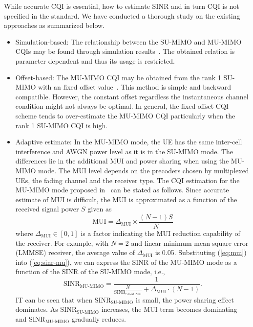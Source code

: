 \documentclass[a4paper,12pt]{article}%
\begin{document}
While accurate CQI is essential, how to estimate SINR and in turn CQI is not specified in the standard. We have conducted a thorough study on the existing approaches as summarized below.
\begin{itemize}
\item Simulation-based: The relationship between the SU-MIMO and MU-MIMO CQIs may be found through simulation results~\cite{Zhu2008}. The obtained relation is parameter dependent and thus its usage is restricted.
%
\item Offset-based: The MU-MIMO CQI may be obtained from the rank 1 SU-MIMO with an fixed offset value~\cite{Maeaettaenen2009}. This method is simple and backward compatible. However, the constant offset regardless the instantaneous channel condition might not always be optimal. In general, the fixed offset CQI scheme tends to over-estimate the MU-MIMO CQI particularly when the rank 1 SU-MIMO CQI is high.
\item Adaptive estimate: In the MU-MIMO mode, the UE has the same inter-cell interference and AWGN power level as it is in the SU-MIMO mode. The differences lie in the additional MUI and power sharing when using the MU-MIMO mode. The MUI level depends on the precoders chosen by multiplexed UEs, the fading channel and the receiver type. The CQI estimation for the MU-MIMO mode proposed in~\cite{Nguyen2012} can be stated as follows.  Since accurate estimate of MUI is difficult, the MUI is approximated as a function of the received signal power $S$ given as
\begin{equation}\label{eq:mui}
\text{MUI}=\Delta_{\text{MUI}} \times \frac{(N-1)S}{N}
\end{equation}
where $\Delta_{\text{MUI}} \in [0,1]$ is a factor indicating the MUI reduction capability of the receiver. For example, with $N=2$ and linear minimum mean square error (LMMSE) receiver, the average value of $\Delta_{\text{MUI}}$ is 0.05. Substituting (\ref{eq:mui}) into (\ref{eq:sinr-mu}), we can express the SINR of the MU-MIMO mode as a function of the SINR of the SU-MIMO mode, i.e.,
\begin{equation}
\text{SINR}_{\text{MU-MIMO}} = \frac{1}{ \frac{N}{\text{SINR}_{\text{SU-MIMO}}} + \Delta_{\text{MUI}} \cdot (N-1)  }.
\end{equation}
IT can be seen that when $\text{SINR}_{\text{SU-MIMO}}$ is small, the power sharing effect dominates. As $\text{SINR}_{\text{SU-MIMO}}$ increases, the MUI term becomes dominating and $\text{SINR}_{\text{MU-MIMO}}$ gradually reduces.

\end{itemize}
\end{document}
